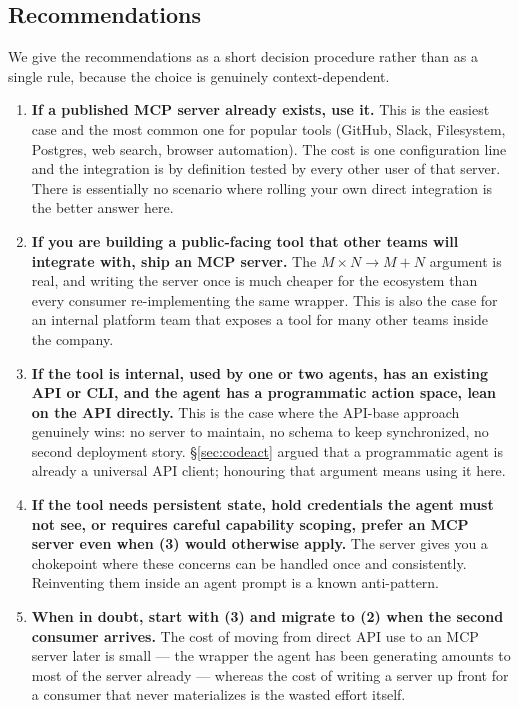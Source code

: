 \subsection{Recommendations}
\label{sec:mcp-recs}

We give the recommendations as a short decision procedure rather
than as a single rule, because the choice is genuinely
context-dependent.

\begin{enumerate}[label=\textbf{(\arabic*)},leftmargin=2.2em,itemsep=0.5em]

\item \textbf{If a published MCP server already exists, use it.}
  This is the easiest case and the most common one for popular
  tools (GitHub, Slack, Filesystem, Postgres, web search, browser
  automation). The cost is one configuration line and the
  integration is by definition tested by every other user of that
  server. There is essentially no scenario where rolling your own
  direct integration is the better answer here.

\item \textbf{If you are building a public-facing tool that other
  teams will integrate with, ship an MCP server.} The
  $M \times N \to M + N$ argument is real, and writing the server
  once is much cheaper for the ecosystem than every consumer
  re-implementing the same wrapper. This is also the case for an
  internal platform team that exposes a tool for many other teams
  inside the company.

\item \textbf{If the tool is internal, used by one or two agents,
  has an existing API or CLI, and the agent has a programmatic
  action space, lean on the API directly.} This is the case where
  the API-base approach genuinely wins: no server to maintain, no
  schema to keep synchronized, no second deployment story.
  \S\ref{sec:codeact} argued that a programmatic agent is already
  a universal API client; honouring that argument means using it
  here.

\item \textbf{If the tool needs persistent state, hold credentials
  the agent must not see, or requires careful capability scoping,
  prefer an MCP server even when (3) would otherwise apply.} The
  server gives you a chokepoint where these concerns can be
  handled once and consistently. Reinventing them inside an agent
  prompt is a known anti-pattern.

\item \textbf{When in doubt, start with (3) and migrate to (2)
  when the second consumer arrives.} The cost of moving from
  direct API use to an MCP server later is small --- the wrapper
  the agent has been generating amounts to most of the server
  already --- whereas the cost of writing a server up front for a
  consumer that never materializes is the wasted effort itself.

\end{enumerate}


